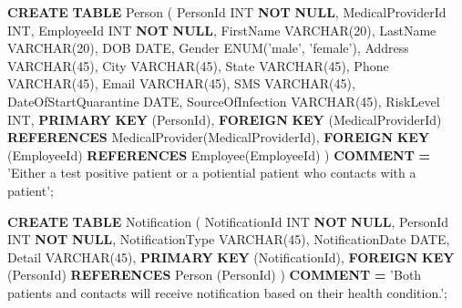 \documentclass[
]{article}
\newenvironment{Shaded}{\begin{snugshade}}{\end{snugshade}}
\newcommand{\DataTypeTok}[1]{\textcolor[rgb]{0.13,0.29,0.53}{#1}}
\newcommand{\DecValTok}[1]{\textcolor[rgb]{0.00,0.00,0.81}{#1}}
\newcommand{\KeywordTok}[1]{\textcolor[rgb]{0.13,0.29,0.53}{\textbf{#1}}}
\newcommand{\NormalTok}[1]{#1}
\newcommand{\OperatorTok}[1]{\textcolor[rgb]{0.81,0.36,0.00}{\textbf{#1}}}
\newcommand{\StringTok}[1]{\textcolor[rgb]{0.31,0.60,0.02}{#1}}
\begin{document}
\begin{Shaded}
\begin{Highlighting}[]
\KeywordTok{CREATE} \KeywordTok{TABLE}\NormalTok{ Person (}
\NormalTok{  PersonId }\DataTypeTok{INT} \KeywordTok{NOT} \KeywordTok{NULL}\NormalTok{,}
\NormalTok{  MedicalProviderId }\DataTypeTok{INT}\NormalTok{,}
\NormalTok{  EmployeeId }\DataTypeTok{INT} \KeywordTok{NOT} \KeywordTok{NULL}\NormalTok{,}
\NormalTok{  FirstName }\DataTypeTok{VARCHAR}\NormalTok{(}\DecValTok{20}\NormalTok{),}
\NormalTok{  LastName }\DataTypeTok{VARCHAR}\NormalTok{(}\DecValTok{20}\NormalTok{),}
\NormalTok{  DOB }\DataTypeTok{DATE}\NormalTok{,}
\NormalTok{  Gender ENUM(}\StringTok{'male'}\NormalTok{, }\StringTok{'female'}\NormalTok{),}
\NormalTok{  Address }\DataTypeTok{VARCHAR}\NormalTok{(}\DecValTok{45}\NormalTok{),}
\NormalTok{  City }\DataTypeTok{VARCHAR}\NormalTok{(}\DecValTok{45}\NormalTok{),}
\NormalTok{  State }\DataTypeTok{VARCHAR}\NormalTok{(}\DecValTok{45}\NormalTok{),}
\NormalTok{  Phone }\DataTypeTok{VARCHAR}\NormalTok{(}\DecValTok{45}\NormalTok{),}
\NormalTok{  Email }\DataTypeTok{VARCHAR}\NormalTok{(}\DecValTok{45}\NormalTok{),}
\NormalTok{  SMS }\DataTypeTok{VARCHAR}\NormalTok{(}\DecValTok{45}\NormalTok{),}
\NormalTok{  DateOfStartQuarantine }\DataTypeTok{DATE}\NormalTok{,}
\NormalTok{  SourceOfInfection }\DataTypeTok{VARCHAR}\NormalTok{(}\DecValTok{45}\NormalTok{),}
\NormalTok{  RiskLevel }\DataTypeTok{INT}\NormalTok{,}
  \KeywordTok{PRIMARY} \KeywordTok{KEY}\NormalTok{ (PersonId),}
  \KeywordTok{FOREIGN} \KeywordTok{KEY}\NormalTok{ (MedicalProviderId)}
    \KeywordTok{REFERENCES}\NormalTok{ MedicalProvider(MedicalProviderId),}
  \KeywordTok{FOREIGN} \KeywordTok{KEY}\NormalTok{ (EmployeeId)}
    \KeywordTok{REFERENCES}\NormalTok{ Employee(EmployeeId)}
\NormalTok{)}
\KeywordTok{COMMENT} \OperatorTok{=} \StringTok{'Either a test positive patient or a potiential patient who contacts with a patient'}\NormalTok{;}


\KeywordTok{CREATE} \KeywordTok{TABLE}\NormalTok{ Notification (}
\NormalTok{  NotificationId }\DataTypeTok{INT} \KeywordTok{NOT} \KeywordTok{NULL}\NormalTok{,}
\NormalTok{  PersonId }\DataTypeTok{INT} \KeywordTok{NOT} \KeywordTok{NULL}\NormalTok{,}
\NormalTok{  NotificationType }\DataTypeTok{VARCHAR}\NormalTok{(}\DecValTok{45}\NormalTok{),}
\NormalTok{  NotificationDate }\DataTypeTok{DATE}\NormalTok{,}
\NormalTok{  Detail }\DataTypeTok{VARCHAR}\NormalTok{(}\DecValTok{45}\NormalTok{),}
  \KeywordTok{PRIMARY} \KeywordTok{KEY}\NormalTok{ (NotificationId),}
  \KeywordTok{FOREIGN} \KeywordTok{KEY}\NormalTok{ (PersonId)}
    \KeywordTok{REFERENCES}\NormalTok{ Person (PersonId)}
\NormalTok{)}
\KeywordTok{COMMENT} \OperatorTok{=} \StringTok{'Both patients and contacts will receive notification based on their health condition.'}\NormalTok{;}



\end{Highlighting}
\end{Shaded}
\end{document}
